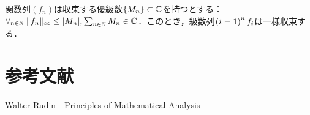 \documentclass[uplatex, dvipdfmx]{jsreport}
\begin{document}
\begin{proposition}
    関数列$(f_n)$は収束する優級数$\{M_n\}\subset\mathbb{C}$を持つとする：$\forall_{n\in\mathbb{N}}\;\|f_n\|_\infty\le\lvert M_n\rvert,\sum_{n\in\mathbb{N}}M_n\in\mathbb{C}$．このとき，級数列$\left(i=1\right)^nf_i$は一様収束する．
\end{proposition}

\chapter{参考文献}

\begin{thebibliography}{9}
    Walter Rudin - Principles of Mathematical Analysis
\end{thebibliography}
\end{document}
